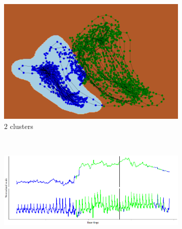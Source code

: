 \documentclass[runningheads]{llncs}
\begin{document}
\begin{figure}[H]
	\centering
	\begin{subfigure}[b]{0.35\textwidth}
		\includegraphics[width=\textwidth]{ex2_pca_cluster_2.png}
		\caption{\(2\) clusters}
		\label{fig:ex2_pca_cluster_2}
	\end{subfigure}
	~
	\begin{subfigure}[b]{0.6\textwidth}
		\includegraphics[width=\textwidth]{ex2_context_timeline_2.png}
		\label{fig:ex2_context_timeline_2}
	\end{subfigure}
	

\end{figure}
\end{document}

